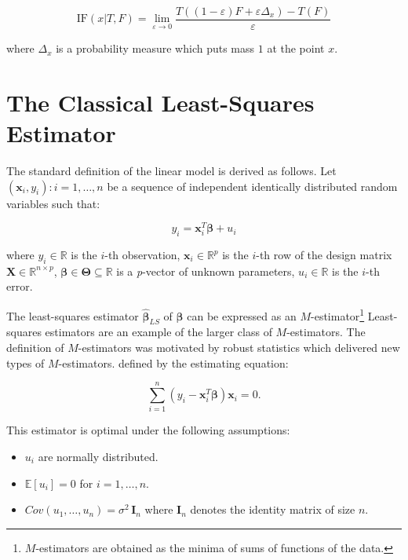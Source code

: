 \documentclass[]{book}
\providecommand{\tightlist}{%
  \setlength{\itemsep}{0pt}\setlength{\parskip}{0pt}}
\let\rmarkdownfootnote\footnote%
\def\footnote{\protect\rmarkdownfootnote}
\theoremstyle{definition}
\theoremstyle{definition}
\theoremstyle{definition}
\theoremstyle{remark}
\begin{document}
\[\text{IF}(x| T, F) = \lim_{\varepsilon \rightarrow 0} \frac{T\left((1-\varepsilon) F + \varepsilon \Delta_x \right) - T\left(F\right)}{\varepsilon}\]

where \(\Delta_x\) is a probability measure which puts mass \(1\) at the
point \(x\).

\hypertarget{the-classical-least-squares-estimator}{%
\section{The Classical Least-Squares
Estimator}\label{the-classical-least-squares-estimator}}

The standard definition of the linear model is derived as follows. Let
\({(\mathbf{x}_{i},y_{i}): i = 1, \ldots, n}\) be a sequence of
independent identically distributed random variables such that:

\[y_{i} = \mathbf{x}_{i}^{T} {\boldsymbol{\beta}} + u_{i}\]

where \(y_{i} \in \mathbb{R}\) is the \(i\)-th observation,
\(\mathbf{x}_{i} \in \mathbb{R}^{p}\) is the \(i\)-th row of the design
matrix \(\mathbf{X} \in \mathbb{R}^{n\times p}\),
\(\boldsymbol{\beta} \in \boldsymbol{\Theta} \subseteq \mathbb{R}\) is a
\emph{p}-vector of unknown parameters, \(u_{i} \in \mathbb{R}\) is the
\(i\)-th error.

The least-squares estimator \(\hat{\boldsymbol{\beta}}_{LS}\) of
\(\boldsymbol{\beta}\) can be expressed as an \(M\)-estimator\footnote{\(M\)-estimators
  are obtained as the minima of sums of functions of the data.}
Least-squares estimators are an example of the larger class of
\(M\)-estimators. The definition of \(M\)-estimators was motivated by
robust statistics which delivered new types of \(M\)-estimators. defined
by the estimating equation:

\begin{equation}
  \sum_{i = 1}^{n} \left(y_{i} - \mathbf{x}_{i}^{T} \boldsymbol{\beta} \right)\mathbf{x}_{i} = 0.
    \label{eq:lsMestim2}
\end{equation}

This estimator is optimal under the following assumptions:

\begin{itemize}
\tightlist
\item
  \(u_{i}\) are normally distributed.
\item
  \(\mathbb{E}[u_{i}] = 0\) for \(i = 1, \ldots, n\).
\item
  \(Cov(u_{1}, \ldots, u_{n}) = \sigma^2 \, \mathbf{I}_{n}\) where
  \(\mathbf{I}_{n}\) denotes the identity matrix of size \(n\).
\end{itemize}
\end{document}

